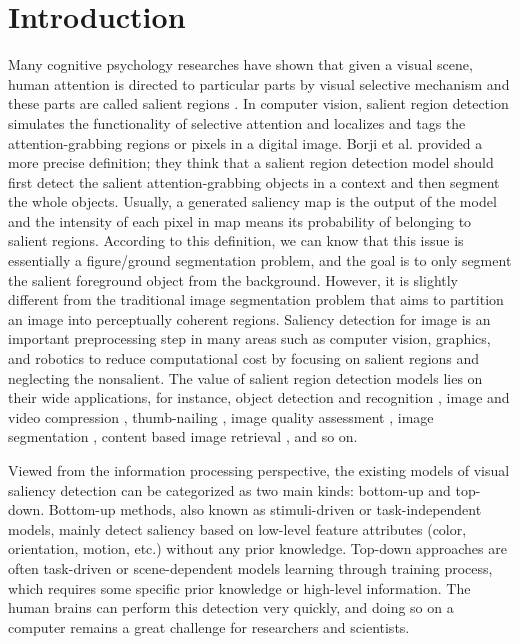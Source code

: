 \section{Introduction}

Many cognitive psychology researches have shown that given a visual scene, human attention is directed to particular parts by visual selective mechanism and these parts are called salient regions \cite{mangun1995neural}. In computer vision, salient region detection simulates the functionality of selective attention and localizes and tags the attention-grabbing regions or pixels in a digital image. Borji et al. \cite{borji2015salient} provided a more precise definition; they think that a salient region detection model should first detect the salient attention-grabbing objects in a context and then segment the whole objects. Usually, a generated saliency map is the output of the model and the intensity of each pixel in map means its probability of belonging to salient regions. According to this definition, we can know that this issue is essentially a figure/ground segmentation problem, and the goal is to only segment the salient foreground object from the background. However, it is slightly different from the traditional image segmentation problem that aims to partition an image into perceptually coherent regions.
Saliency detection for image is an important preprocessing step in many areas such as computer vision, graphics, and robotics to reduce computational cost by focusing on salient regions and neglecting the nonsalient. The value of salient region detection models lies on their wide applications, for instance, object detection and recognition \cite{ren2014region}, image and video compression \cite{guo2010novel}, thumb-nailing \cite{huang2011arcimboldo}, image quality assessment \cite{ li2013color}, image segmentation \cite{qin2014integration}, content based image retrieval \cite{feng2010attention}, and so on.



\noindent
Viewed from the information processing perspective, the existing models of visual saliency detection can be categorized as two main kinds: bottom-up and top-down. Bottom-up methods, also known as stimuli-driven or task-independent models, mainly detect saliency based on low-level feature attributes (color, orientation, motion, etc.) without any prior knowledge. Top-down approaches are often task-driven or scene-dependent models learning through training process, which requires some specific prior knowledge or high-level information. The human brains can perform this detection very quickly, and doing so on a computer remains a great challenge for researchers and scientists.


